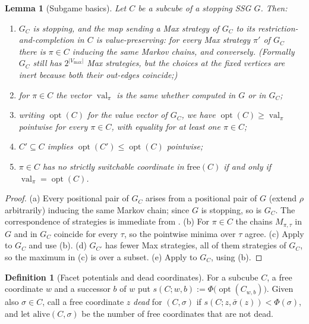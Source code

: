 \documentclass[11pt]{article}
\theoremstyle{plain}
\newtheorem{lemma}[theorem]{Lemma}
\theoremstyle{definition}
\newtheorem{definition}[theorem]{Definition}
\DeclareMathOperator{\val}{val}
\DeclareMathOperator{\opt}{opt}
\newcommand{\Vmax}{V_{\max}}
\begin{document}
\begin{lemma}[Subgame basics]\label{lem:subgame}
Let $C$ be a subcube of a stopping SSG $G$. Then:
\begin{enumerate}[label=(\alph*),leftmargin=2.2em]
\item $G_C$ is stopping, and the map sending a Max strategy of $G_C$ to its
  restriction-and-completion in $C$ is value-preserving: for every Max
  strategy $\pi'$ of $G_C$ there is $\pi\in C$ inducing the same Markov
  chains, and conversely. (Formally $G_C$ still has $2^{|\Vmax|}$ Max
  strategies, but the choices at the fixed vertices are inert because both
  their out-edges coincide;)
\item for $\pi\in C$ the vector $\val_\pi$ is the same whether computed
  in $G$ or in $G_C$;
\item writing $\opt(C)$ for the value vector of $G_C$, we have
  $\opt(C)\ge\val_\pi$ pointwise for every $\pi\in C$, with equality for
  at least one $\pi\in C$;
\item $C'\subseteq C$ implies $\opt(C')\le\opt(C)$ pointwise;
\item $\pi\in C$ has no strictly switchable coordinate in
  $\mathrm{free}(C)$ if and only if $\val_\pi=\opt(C)$.
\end{enumerate}
\end{lemma}

\begin{proof}
(a) Every positional pair of $G_C$ arises from a positional pair of $G$
(extend $\rho$ arbitrarily) inducing the same Markov chain; since $G$ is
stopping, so is $G_C$. The correspondence of strategies is immediate from
. (b) For $\pi\in C$ the chains $M_{\pi,\tau}$ in $G$
and in $G_C$ coincide for every $\tau$, so the pointwise minima over
$\tau$ agree. (c) Apply  to $G_C$ and use
(b). (d) $G_{C'}$ has fewer Max strategies, all of them strategies of
$G_C$, so the maximum in (c) is over a subset. (e) Apply
 to $G_C$, using (b).
\end{proof}

\begin{definition}[Facet potentials and dead coordinates]\label{def:dead}
For a subcube $C$, a free coordinate $w$ and a successor $b$ of $w$ put
$s(C;w,b):=\Phi\bigl(\opt(C_{w,b})\bigr)$. Given also $\sigma\in C$, call
a free coordinate $z$ \emph{dead} for $(C,\sigma)$ if
$s(C;z,\bar\sigma(z))<\Phi(\sigma)$, and let $\mathrm{alive}(C,\sigma)$
be the number of free coordinates that are not dead.
\end{definition}
\end{document}
